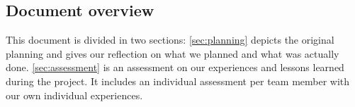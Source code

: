 
\subsection{Document overview}
This document is divided in two sections:
\ref{sec:planning} depicts the original planning and gives our reflection on what we planned and what was actually done.
\ref{sec:assessment} is an assessment on our experiences and lessons learned during the project.
It includes an individual assessment per team member with our own individual experiences.